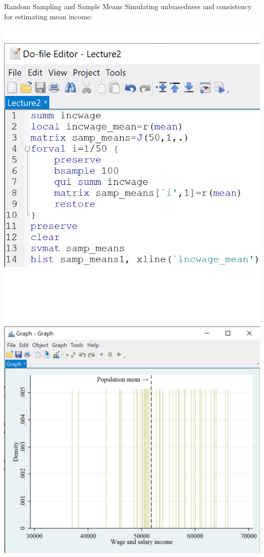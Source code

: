 \documentclass[11pt,english,handout]{beamer}
\begin{document}
\begin{frame}{Random Sampling and Sample Means}
\vspace{0.2cm}
Simulating unbiasedness and consistency for estimating mean income:

\begin{center}
\includegraphics[scale=0.45]{stata18.png} \includegraphics[scale=0.5]{stata21.png}
\end{center}

\end{frame}
\end{document}
